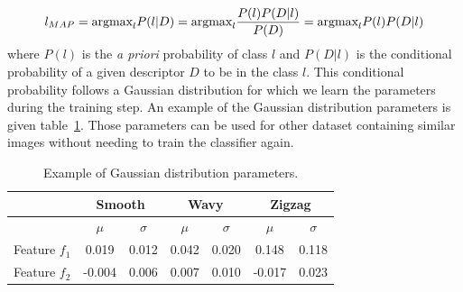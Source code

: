 \begin{equation}\label{eq:be:fine_class}
  l_{MAP} \\
  = \mbox{argmax}_{l} P(l|D) \\
  = \mbox{argmax}_{l} \frac{P(l) P(D | l)}{P(D)}\\
  = \mbox{argmax}_{l} P(l) P(D | l)
\end{equation}
where $P(l)$ is the \textit{a priori} probability of class $l$ and $P(D|l)$ is the conditional probability of a given descriptor $D$ to be in the class $l$. This conditional probability follows a Gaussian distribution for which we learn the parameters during the training step. An example of the Gaussian distribution parameters is given table~\ref{tab:in:coefficient}. Those parameters can be used for other dataset containing similar images without needing to train the classifier again.


	\begin{table}[ht]

		\centering
		\caption{Example of Gaussian distribution parameters.}
		\begin{tabular}{|c|c|c|c|c|c|c|}
	\hline
	  & \multicolumn{2}{|c|}{Smooth}& \multicolumn{2}{|c|}{Wavy}& \multicolumn{2}{|c|}{Zigzag}	\\
	\hline
	  & $\mu$ & $\sigma$ & $\mu$ & $\sigma$ & $\mu$ & $\sigma$ 	 	\\
	\hline
	  Feature $f_1$ & 0.019 	& 0.012 & 0.042 & 0.020 & 0.148 & 0.118   \\
	\hline
	  Feature $f_2$ & -0.004 	& 0.006 & 0.007 & 0.010 & -0.017 & 0.023   \\
	\hline
	      \end{tabular}
		\label{tab:in:coefficient}
	\end{table}%




